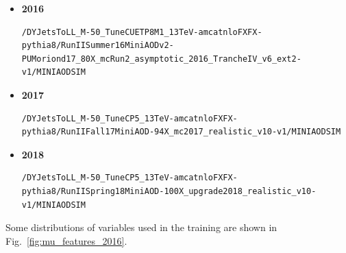 \begin{itemize}
\item \textbf{2016} \begin{verbatim}/DYJetsToLL_M-50_TuneCUETP8M1_13TeV-amcatnloFXFX-pythia8/RunIISummer16MiniAODv2-PUMoriond17_80X_mcRun2_asymptotic_2016_TrancheIV_v6_ext2-v1/MINIAODSIM\end{verbatim}
\item \textbf{2017} \begin{verbatim}/DYJetsToLL_M-50_TuneCP5_13TeV-amcatnloFXFX-pythia8/RunIIFall17MiniAOD-94X_mc2017_realistic_v10-v1/MINIAODSIM\end{verbatim}
\item \textbf{2018} \begin{verbatim}/DYJetsToLL_M-50_TuneCP5_13TeV-amcatnloFXFX-pythia8/RunIISpring18MiniAOD-100X_upgrade2018_realistic_v10-v1/MINIAODSIM\end{verbatim}
\end{itemize}

Some distributions of variables used in the training are shown in Fig.~\ref{fig:mu_features_2016}.

